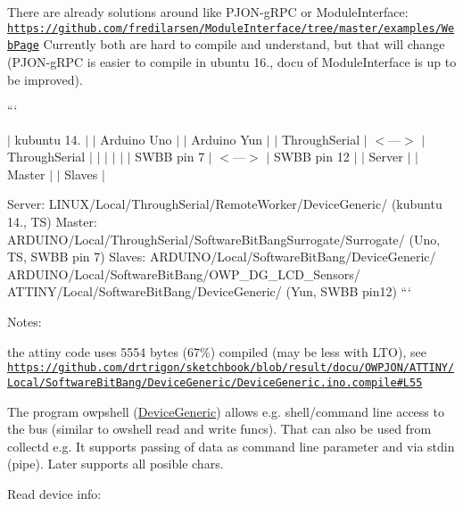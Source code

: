 There are already solutions around like P\-J\-O\-N-\/g\-R\-P\-C or Module\-Interface\-: \href{https://github.com/fredilarsen/ModuleInterface/tree/master/examples/WebPage}{\tt https\-://github.\-com/fredilarsen/\-Module\-Interface/tree/master/examples/\-Web\-Page} Currently both are hard to compile and understand, but that will change (P\-J\-O\-N-\/g\-R\-P\-C is easier to compile in ubuntu 16., docu of Module\-Interface is up to be improved).

``` 

 $\vert$ kubuntu 14. $\vert$ $\vert$ Arduino Uno $\vert$ $\vert$ Arduino Yun $\vert$ $\vert$ Through\-Serial $\vert$ $<$---$>$ $\vert$ Through\-Serial $\vert$ $\vert$ $\vert$ $\vert$ $\vert$ $\vert$ S\-W\-B\-B pin 7 $\vert$ $<$---$>$ $\vert$ S\-W\-B\-B pin 12 $\vert$ $\vert$ Server $\vert$ $\vert$ Master $\vert$ $\vert$ Slaves $\vert$ 



Server\-: L\-I\-N\-U\-X/\-Local/\-Through\-Serial/\-Remote\-Worker/\-Device\-Generic/ (kubuntu 14., T\-S) Master\-: A\-R\-D\-U\-I\-N\-O/\-Local/\-Through\-Serial/\-Software\-Bit\-Bang\-Surrogate/\-Surrogate/ (Uno, T\-S, S\-W\-B\-B pin 7) Slaves\-: A\-R\-D\-U\-I\-N\-O/\-Local/\-Software\-Bit\-Bang/\-Device\-Generic/ A\-R\-D\-U\-I\-N\-O/\-Local/\-Software\-Bit\-Bang/\-O\-W\-P\-\_\-\-D\-G\-\_\-\-L\-C\-D\-\_\-\-Sensors/ A\-T\-T\-I\-N\-Y/\-Local/\-Software\-Bit\-Bang/\-Device\-Generic/ (Yun, S\-W\-B\-B pin12) ```

Notes\-:
\begin{DoxyItemize}
\item the attiny code uses 5554 bytes (67\%) compiled (may be less with L\-T\-O), see \href{https://github.com/drtrigon/sketchbook/blob/result/docu/OWPJON/ATTINY/Local/SoftwareBitBang/DeviceGeneric/DeviceGeneric.ino.compile#L55}{\tt https\-://github.\-com/drtrigon/sketchbook/blob/result/docu/\-O\-W\-P\-J\-O\-N/\-A\-T\-T\-I\-N\-Y/\-Local/\-Software\-Bit\-Bang/\-Device\-Generic/\-Device\-Generic.\-ino.\-compile\#\-L55}
\end{DoxyItemize}

The program {\ttfamily owpshell} (\hyperlink{namespaceDeviceGeneric}{Device\-Generic}) allows e.\-g. shell/command line access to the bus (similar to owshell read and write funcs). That can also be used from collectd e.\-g. It supports passing of data as command line parameter and via stdin (pipe). Later supports all posible chars.

Read device info\-: 


